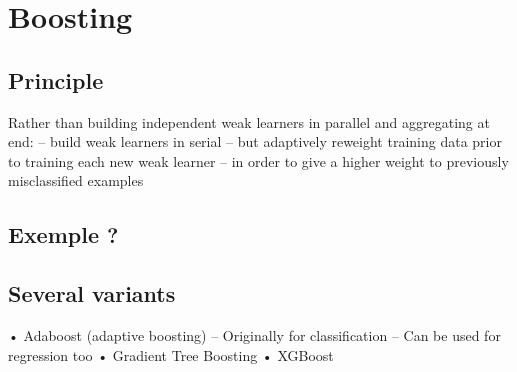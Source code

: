 \section{Boosting}

	\subsection{Principle}
	Rather than building independent weak learners in parallel and
aggregating at end:
– build weak learners in serial
– but adaptively reweight training data prior to training each new weak learner
– in order to give a higher weight to previously misclassified examples

	\subsection{Exemple ?}

\subsection{Several variants}
• Adaboost (adaptive boosting)
– Originally for classification
– Can be used for regression too
• Gradient Tree Boosting
• XGBoost
